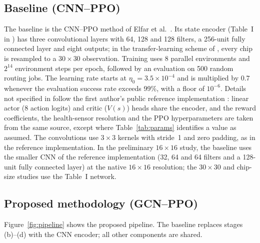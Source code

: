 \documentclass[11pt,a4paper]{article}
\begin{document}
\subsection{Baseline (CNN--PPO)}
The baseline is the CNN--PPO method of Elfar et al.\ \cite{elfar2023}. Its
state encoder (Table~I in \cite{elfar2023}) has three convolutional layers
with 64, 128 and 128 filters, a 256-unit fully connected layer and eight
outputs; in the transfer-learning scheme of \cite{elfar2023}, every chip is
resampled to a $30\times30$ observation. Training uses 8 parallel environments
and $2^{14}$ environment steps per epoch, followed by an evaluation on 500
random routing jobs. The learning rate starts at $\eta_0=3.5\times10^{-4}$ and
is multiplied by $0.7$ whenever the evaluation success rate exceeds 99\%, with
a floor of $10^{-6}$. Details not specified in \cite{elfar2023} follow the
first author's public reference implementation \cite{elfarcode}: linear actor
(8 action logits) and critic ($V(s)$) heads share the encoder, and the reward
coefficients, the health-sensor resolution and the PPO hyperparameters are
taken from the same source, except where Table~\ref{tab:params} identifies a
value as assumed. The convolutions use $3\times3$ kernels with stride~1 and
zero padding, as in the reference implementation. In the preliminary $16\times16$ study, the baseline uses the
smaller CNN of the reference implementation (32, 64 and 64 filters and a
128-unit fully connected layer) at the native $16\times16$ resolution; the
$30\times30$ and chip-size studies use the Table~I network.

\subsection{Proposed methodology (GCN--PPO)}
Figure~\ref{fig:pipeline} shows the proposed pipeline. The baseline replaces
stages (b)--(d) with the CNN encoder; all other components are shared.
\end{document}

